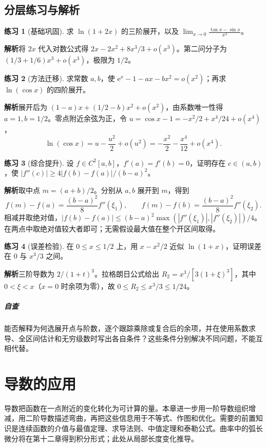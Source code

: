 \documentclass[UTF8,fontset=fandol,12pt,oneside,openany]{ctexrep}
\newcommand{\ee}{\mathrm e}
\theoremstyle{definition}
\newtheorem{exercise}{练习}[chapter]
\begin{document}
\section{分层练习与解析}
\begin{exercise}[基础巩固]求 $\ln(1+2x)$ 的三阶展开，以及 $\displaystyle\lim_{x\to0}\frac{\tan x-\sin x}{x^3}$。\end{exercise}
\noindent\textbf{解析}\quad 将 $2x$ 代入对数公式得 $2x-2x^2+8x^3/3+o(x^3)$。第二问分子为 $(1/3+1/6)x^3+o(x^3)$，极限为 $1/2$。
\begin{exercise}[方法迁移]求常数 $a,b$，使 $\ee^x-1-ax-bx^2=o(x^2)$；再求 $\ln(\cos x)$ 的四阶展开。\end{exercise}
\noindent\textbf{解析}\quad 展开后为 $(1-a)x+(1/2-b)x^2+o(x^2)$，由系数唯一性得 $a=1,b=1/2$。零点附近余弦为正，令 $u=\cos x-1=-x^2/2+x^4/24+o(x^4)$，
\[
\ln(\cos x)=u-\frac{u^2}2+o(u^2)
=-\frac{x^2}2-\frac{x^4}{12}+o(x^4).
\]
\begin{exercise}[综合提升]设 $f\in C^2[a,b]$，$f'(a)=f'(b)=0$，证明存在 $c\in(a,b)$，使 $|f''(c)|\ge4|f(b)-f(a)|/(b-a)^2$。\end{exercise}
\noindent\textbf{解析}\quad 取中点 $m=(a+b)/2$。分别从 $a,b$ 展开到 $m$，得到
\[
f(m)-f(a)=\frac{(b-a)^2}8f''(\xi_1),\qquad
f(m)-f(b)=\frac{(b-a)^2}8f''(\xi_2).
\]
相减并取绝对值，$|f(b)-f(a)|\le(b-a)^2\max(|f''(\xi_1)|,|f''(\xi_2)|)/4$。在两点中取绝对值较大者即可；无需假设最大值在整个开区间取得。
\begin{exercise}[误差检验]在 $0\le x\le1/2$ 上，用 $x-x^2/2$ 近似 $\ln(1+x)$，证明误差在 $0$ 与 $x^3/3$ 之间。\end{exercise}
\noindent\textbf{解析}\quad 三阶导数为 $2/(1+t)^3$。拉格朗日公式给出 $R_2=x^3/[3(1+\xi)^3]$，其中 $0<\xi<x$（$x=0$ 时余项为零），故 $0\le R_2\le x^3/3\le1/24$。
\paragraph{自查}能否解释为何选展开点与阶数，逐个跟踪乘除或复合后的余项，并在使用系数求导、全区间估计和无穷级数时写出各自条件？这些条件分别解决不同问题，不能互相代替。


\chapter{导数的应用}
\label{lec:09:chapter}
导数把函数在一点附近的变化转化为可计算的量。本章进一步用一阶导数组织增减，用二阶导数描述弯曲，再把这些信息用于不等式、作图和优化。需要的前置知识是连续函数的介值与最值定理、求导法则、中值定理和泰勒公式。曲率中的弧长微分将在第十二章得到积分形式；此处从局部长度变化推导。
\end{document}
